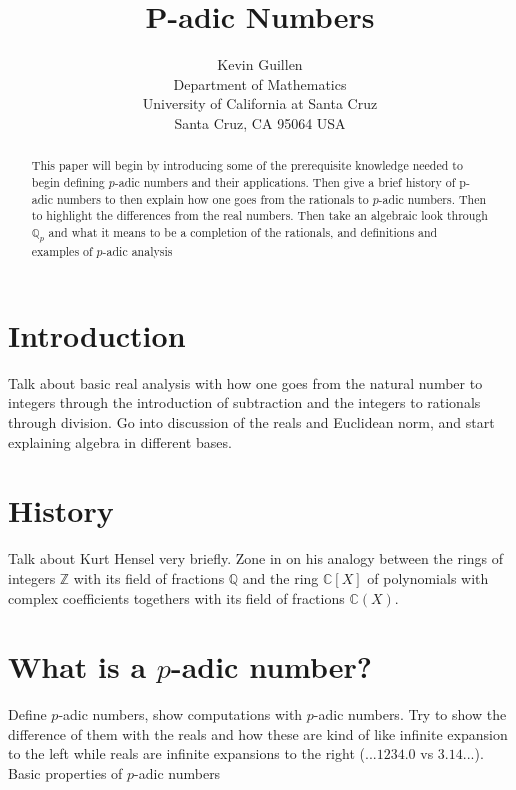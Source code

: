 \documentclass[12pt]{article}
\newcommand{\zz}{\mathbb Z}   %
\newcommand{\qq}{\mathbb Q}   %
\newcommand{\cc}{\mathbb C}   %
\begin{document}
\title{P-adic Numbers}

\author{Kevin Guillen \\ 
Department of Mathematics \\
University of California at Santa Cruz \\
Santa Cruz, CA 95064 USA}

\maketitle

\begin{abstract}
This paper will begin by introducing some of the prerequisite knowledge needed to begin defining $p$-adic numbers and their applications. Then give a brief history of p-adic numbers to then explain how one goes from the rationals to $p$-adic numbers. Then to highlight the differences from the real numbers. Then take an algebraic look through $\qq_p$ and what it means to be a completion of the rationals, and definitions and examples of  $p$-adic analysis
\end{abstract}

\section{Introduction}
Talk about basic real analysis with how one goes from the natural number to integers through the introduction of subtraction and the integers to rationals through division. Go into discussion of the reals and Euclidean norm, and start explaining algebra in different bases. 

\section{History}
Talk about Kurt Hensel very briefly. Zone in on his analogy between the rings of integers $\zz$ with its field of fractions $\qq$ and the ring $\cc[X]$ of polynomials with complex coefficients togethers with its field of fractions $\cc(X)$.

\section{What is a $p$-adic number?}
Define $p$-adic numbers, show computations with $p$-adic numbers. Try to show the difference of them with the reals and how these are kind of like infinite expansion to the left while reals are infinite expansions to the right ($...1234.0 $ vs $3.14...$). Basic properties of $p$-adic numbers
\end{document}
